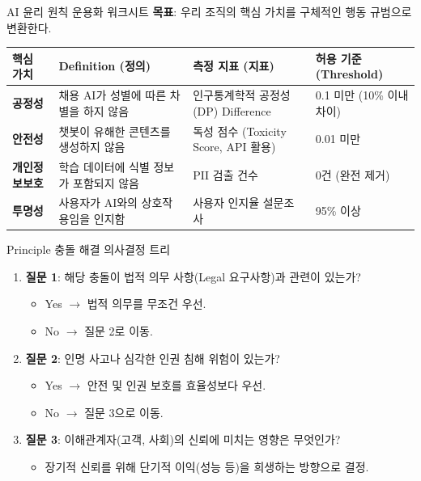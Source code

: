 \begin{practicaltool}{AI 윤리 원칙 운용화 워크시트}
\textbf{목표}: 우리 조직의 핵심 가치를 구체적인 행동 규범으로 변환한다.

\begin{tabular}{|p{}|p{}|p{}|p{}|}
\hline
\textbf{핵심 가치} & \textbf{Definition (정의)} & \textbf{측정 지표 (지표)} & \textbf{허용 기준 (Threshold)} \\ \hline
\textbf{공정성} & 채용 AI가 성별에 따른 차별을 하지 않음 & 인구통계학적 공정성(DP) Difference & 0.1 미만 (10\% 이내 차이) \\ \hline
\textbf{안전성} & 챗봇이 유해한 콘텐츠를 생성하지 않음 & 독성 점수 (Toxicity Score, API 활용) & 0.01 미만 \\ \hline
\textbf{개인정보보호} & 학습 데이터에 식별 정보가 포함되지 않음 & PII 검출 건수 & 0건 (완전 제거) \\ \hline
\textbf{투명성} & 사용자가 AI와의 상호작용임을 인지함 & 사용자 인지율 설문조사 & 95\% 이상 \\ \hline
\end{tabular}
\end{practicaltool}

\begin{practicaltool}{Principle 충돌 해결 의사결정 트리}
\begin{enumerate}
 \item \textbf{질문 1}: 해당 충돌이 법적 의무 사항(Legal 요구사항)과 관련이 있는가?
 \begin{itemize}
 \item Yes $\rightarrow$ 법적 의무를 무조건 우선.
 \item No $\rightarrow$ 질문 2로 이동.
 \end{itemize}
 \item \textbf{질문 2}: 인명 사고나 심각한 인권 침해 위험이 있는가?
 \begin{itemize}
 \item Yes $\rightarrow$ 안전 및 인권 보호를 효율성보다 우선.
 \item No $\rightarrow$ 질문 3으로 이동.
 \end{itemize}
 \item \textbf{질문 3}: 이해관계자(고객, 사회)의 신뢰에 미치는 영향은 무엇인가?
 \begin{itemize}
 \item 장기적 신뢰를 위해 단기적 이익(성능 등)을 희생하는 방향으로 결정.
 \end{itemize}
\end{enumerate}
\end{practicaltool}

